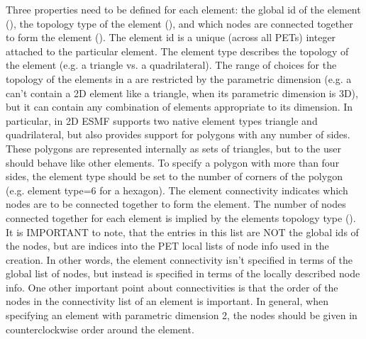 \documentclass[letterpaper,10pt,english]{sphinxmanual}
\begin{document}
Three properties need to be defined for each {\hyperref[\detokenize{mesh:ESMF.api.mesh.Mesh}]{}} element: the global id of the
element (), the topology type of the element (), and
which nodes are connected together to form the element (). The
element id is a unique (across all PETs) integer attached to the
particular element. The element type describes the topology of the element
(e.g. a triangle vs. a quadrilateral). The range of choices for the topology of
the elements in a {\hyperref[\detokenize{mesh:ESMF.api.mesh.Mesh}]{}} are restricted by the {\hyperref[\detokenize{mesh:ESMF.api.mesh.Mesh}]{}} parametric dimension (e.g. a
{\hyperref[\detokenize{mesh:ESMF.api.mesh.Mesh}]{}} can’t contain a 2D element like a triangle, when its parametric dimension
is 3D), but it can contain any combination of elements appropriate to its
dimension. In particular, in 2D ESMF supports two native element types triangle
and quadrilateral, but also provides support for polygons with any number of
sides. These polygons are represented internally as sets of triangles, but to
the user should behave like other elements. To specify a polygon with more than
four sides, the element type should be set to the number of corners of the
polygon (e.g. element type=6 for a hexagon). The element connectivity indicates
which nodes are to be connected together to form the element. The number of
nodes connected together for each element is implied by the elements topology
type (). It is IMPORTANT to note, that the entries in this list are
NOT the global ids of the nodes, but are indices into the PET local lists
of node info used in the {\hyperref[\detokenize{mesh:ESMF.api.mesh.Mesh}]{}} creation. In other words, the element connectivity
isn’t specified in terms of the global list of nodes, but instead is specified
in terms of the locally described node info. One other important point about
connectivities is that the order of the nodes in the connectivity list of an
element is important. In general, when specifying an element with parametric
dimension 2, the nodes should be given in counterclockwise order around the
element.
\end{document}
